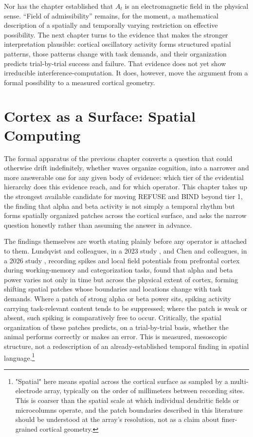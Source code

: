 \documentclass[11pt]{book}
\begin{document}
Nor has the chapter established that $A_t$ is an electromagnetic field in the physical sense. ``Field of admissibility'' remains, for the moment, a mathematical description of a spatially and temporally varying restriction on effective possibility. The next chapter turns to the evidence that makes the stronger interpretation plausible: cortical oscillatory activity forms structured spatial patterns, those patterns change with task demands, and their organization predicts trial-by-trial success and failure. That evidence does not yet show irreducible interference-computation. It does, however, move the argument from a formal possibility to a measured cortical geometry.

\chapter{Cortex as a Surface: Spatial Computing}

The formal apparatus of the previous chapter converts a question that could otherwise drift indefinitely, whether waves organize cognition, into a narrower and more answerable one for any given body of evidence: which tier of the evidential hierarchy does this evidence reach, and for which operator. This chapter takes up the strongest available candidate for moving REFUSE and BIND beyond tier 1, the finding that alpha and beta activity is not simply a temporal rhythm but forms spatially organized patches across the cortical surface, and asks the narrow question honestly rather than assuming the answer in advance.

The findings themselves are worth stating plainly before any operator is attached to them. Lundqvist and colleagues, in a 2023 study \cite{lundqvist2023}, and Chen and colleagues, in a 2026 study \cite{chen2026}, recording spikes and local field potentials from prefrontal cortex during working-memory and categorization tasks, found that alpha and beta power varies not only in time but across the physical extent of cortex, forming shifting spatial patches whose boundaries and locations change with task demands. Where a patch of strong alpha or beta power sits, spiking activity carrying task-relevant content tends to be suppressed; where the patch is weak or absent, such spiking is comparatively free to occur. Critically, the spatial organization of these patches predicts, on a trial-by-trial basis, whether the animal performs correctly or makes an error. This is measured, mesoscopic structure, not a redescription of an already-established temporal finding in spatial language.\footnote{"Spatial" here means spatial across the cortical surface as sampled by a multi-electrode array, typically on the order of millimeters between recording sites. This is coarser than the spatial scale at which individual dendritic fields or microcolumns operate, and the patch boundaries described in this literature should be understood at the array's resolution, not as a claim about finer-grained cortical geometry.}
\end{document}
